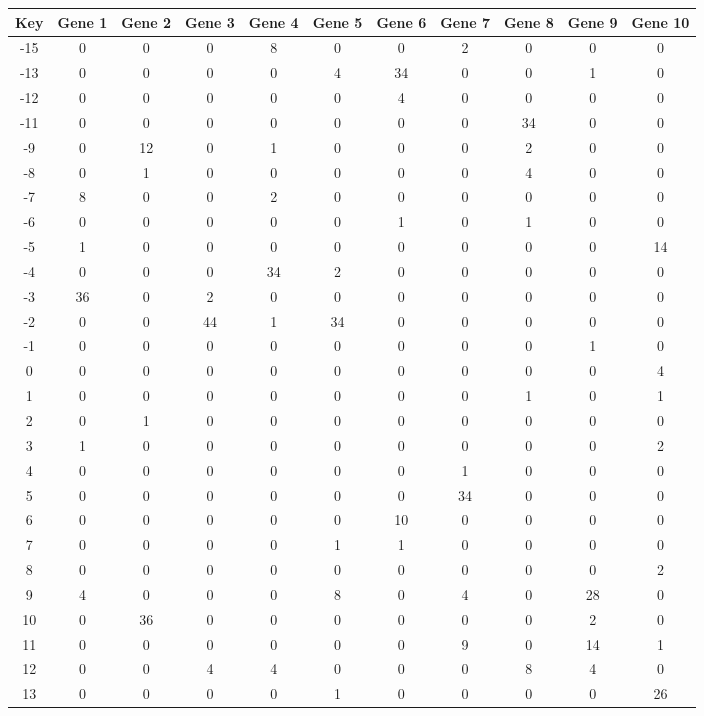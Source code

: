 \begin{tabular}{|c|c|c|c|c|c|c|c|c|c|c|}
\hline
Key & Gene 1 & Gene 2 & Gene 3 & Gene 4 & Gene 5 & Gene 6 & Gene 7 & Gene 8 & Gene 9 & Gene 10 \\
\hline
-15 & 0 & 0 & 0 & 8 & 0 & 0 & 2 & 0 & 0 & 0 \\
-13 & 0 & 0 & 0 & 0 & 4 & 34 & 0 & 0 & 1 & 0 \\
-12 & 0 & 0 & 0 & 0 & 0 & 4 & 0 & 0 & 0 & 0 \\
-11 & 0 & 0 & 0 & 0 & 0 & 0 & 0 & 34 & 0 & 0 \\
-9 & 0 & 12 & 0 & 1 & 0 & 0 & 0 & 2 & 0 & 0 \\
-8 & 0 & 1 & 0 & 0 & 0 & 0 & 0 & 4 & 0 & 0 \\
-7 & 8 & 0 & 0 & 2 & 0 & 0 & 0 & 0 & 0 & 0 \\
-6 & 0 & 0 & 0 & 0 & 0 & 1 & 0 & 1 & 0 & 0 \\
-5 & 1 & 0 & 0 & 0 & 0 & 0 & 0 & 0 & 0 & 14 \\
-4 & 0 & 0 & 0 & 34 & 2 & 0 & 0 & 0 & 0 & 0 \\
-3 & 36 & 0 & 2 & 0 & 0 & 0 & 0 & 0 & 0 & 0 \\
-2 & 0 & 0 & 44 & 1 & 34 & 0 & 0 & 0 & 0 & 0 \\
-1 & 0 & 0 & 0 & 0 & 0 & 0 & 0 & 0 & 1 & 0 \\
0 & 0 & 0 & 0 & 0 & 0 & 0 & 0 & 0 & 0 & 4 \\
1 & 0 & 0 & 0 & 0 & 0 & 0 & 0 & 1 & 0 & 1 \\
2 & 0 & 1 & 0 & 0 & 0 & 0 & 0 & 0 & 0 & 0 \\
3 & 1 & 0 & 0 & 0 & 0 & 0 & 0 & 0 & 0 & 2 \\
4 & 0 & 0 & 0 & 0 & 0 & 0 & 1 & 0 & 0 & 0 \\
5 & 0 & 0 & 0 & 0 & 0 & 0 & 34 & 0 & 0 & 0 \\
6 & 0 & 0 & 0 & 0 & 0 & 10 & 0 & 0 & 0 & 0 \\
7 & 0 & 0 & 0 & 0 & 1 & 1 & 0 & 0 & 0 & 0 \\
8 & 0 & 0 & 0 & 0 & 0 & 0 & 0 & 0 & 0 & 2 \\
9 & 4 & 0 & 0 & 0 & 8 & 0 & 4 & 0 & 28 & 0 \\
10 & 0 & 36 & 0 & 0 & 0 & 0 & 0 & 0 & 2 & 0 \\
11 & 0 & 0 & 0 & 0 & 0 & 0 & 9 & 0 & 14 & 1 \\
12 & 0 & 0 & 4 & 4 & 0 & 0 & 0 & 8 & 4 & 0 \\
13 & 0 & 0 & 0 & 0 & 1 & 0 & 0 & 0 & 0 & 26 \\
\hline
\end{tabular}
